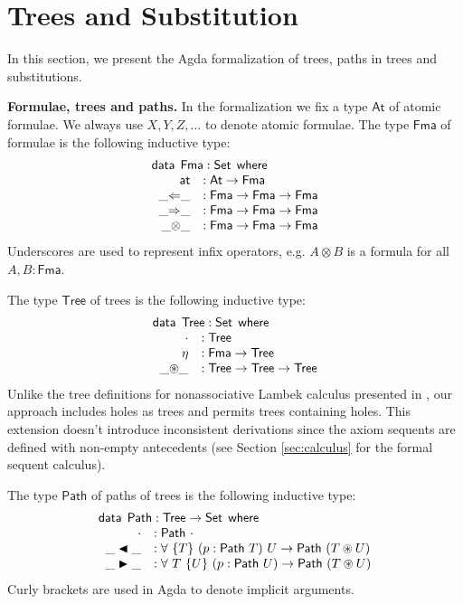 \documentclass[runningheads]{llncs}
\newcommand{\ot}{\otimes}
\newcommand{\cdast}{\circledast}
\newcommand{\Larr}{\Leftarrow}
\newcommand{\Rarr}{\Rightarrow}
\newcommand{\btleft}{\blacktriangleleft}
\newcommand{\btright}{\blacktriangleright}
\newcommand{\At}{\mathsf{At}}
\newcommand{\at}{\mathsf{at}}
\newcommand{\Fma}{\mathsf{Fma}}
\newcommand{\data}{\mathsf{data}}
\newcommand{\Tree}{\mathsf{Tree}}
\newcommand{\Path}{\mathsf{Path}}
\newcommand{\path}[1]{\mathsf{Path} ~ #1}
\newcommand{\where}{\mathsf{where}}
\newcommand{\Set}{\mathsf{Set}}
\begin{document}
\section{Trees and Substitution}
In this section, we present the Agda formalization of trees, paths in trees and substitutions.

\noindent\textbf{Formulae, trees and paths.} In the formalization we fix a type $\At$ of atomic formulae. We always use $X, Y, Z,\dots$ to denote atomic formulae.
The type $\Fma$ of formulae is the following inductive type:
\[
\begin{array}{rl}
  \multicolumn{2}{l}{\data \:\:  \Fma : \Set \:\: \where} \\
  \;\; \at &: \At \to \Fma \\
  \;\; \_{\Larr}\_ &: \Fma \to \Fma \to \Fma \\ 
  \;\; \_{\Rarr}\_ &: \Fma \to \Fma \to \Fma \\ 
  \;\; \_{\ot}\_ &: \Fma \to \Fma \to \Fma \\
\end{array}
\]
Underscores are used to represent infix operators, e.g. $A \ot B$ is a formula for all $A,B : \Fma$.

The type $\Tree$ of trees is the following inductive type:
\[
\begin{array}{rl}
  \multicolumn{2}{l}{\data \:\:  \Tree : \Set \:\: \where} \\
  \;\; \cdot &: \Tree \\
  \;\; \eta &: \Fma \to \Tree \\
  \;\; \_{\cdast}\_ &: \Tree \to \Tree \to \Tree \\
\end{array}
\]
Unlike the tree definitions for nonassociative Lambek calculus presented in \cite{moot:categorial:2012}, our approach includes holes as trees and permits trees containing holes. This extension doesn't introduce inconsistent derivations since the axiom sequents are defined with non-empty antecedents (see Section \ref{sec:calculus} for the formal sequent calculus).

The type $\Path$ of paths of trees is the following inductive type:
\[
\begin{array}{rl}
  \multicolumn{2}{l}{\data \:\:  \Path : \Tree \to \Set \:\: \where} \\
  \;\; \cdot &: \path{\cdot} \\
  \;\; \_\btleft\_ &: \forall ~ \{T\} ~ (p : \path{T}) ~ U \to \path{(T \cdast U)} \\
  \;\; \_\btright\_ &: \forall ~ T ~ \{U\} ~ (p : \path{U}) \to \path{(T \cdast U)}
\end{array}
\]
Curly brackets are used in Agda to denote implicit arguments.
\end{document}
